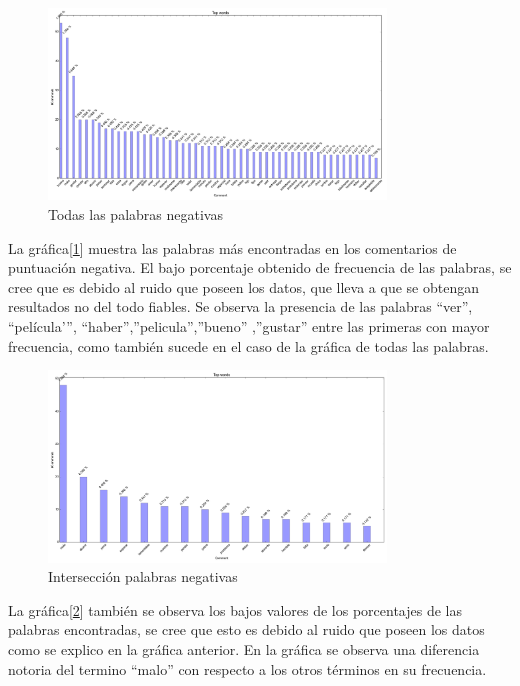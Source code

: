 \documentclass[12pt]{article}
\begin{document}
\begin{figure}[!h]
  \centering
    \includegraphics[width=0.8\textwidth]{./fig/NegativeWords.png}
  \caption{Todas las palabras negativas}
  \label{fig:allneg}
\end{figure} 
La gráfica[\ref{fig:allneg}] muestra las palabras más encontradas en los comentarios de puntuación negativa. El bajo porcentaje obtenido de frecuencia de las palabras, se cree que es debido al ruido que poseen los datos, que lleva a que se obtengan resultados no del todo fiables. Se observa la presencia de las palabras “ver”, “película'”, “haber”,”pelicula”,”bueno” ,”gustar” entre las primeras con mayor frecuencia, como también sucede en el caso de la gráfica de todas las palabras.


\begin{figure}[!h]
  \centering
    \includegraphics[width=0.8\textwidth]{./fig/NegativeSubjetive.png}
  \caption{Intersección palabras negativas}
  \label{fig:negsub}
\end{figure} 

La gráfica[\ref{fig:negsub}] también se observa los bajos valores de los porcentajes de las palabras encontradas, se cree que esto es debido al ruido que poseen los datos como se explico en la gráfica anterior. En la gráfica se observa una diferencia notoria del termino “malo” con respecto a los otros términos en su frecuencia.
\end{document}
